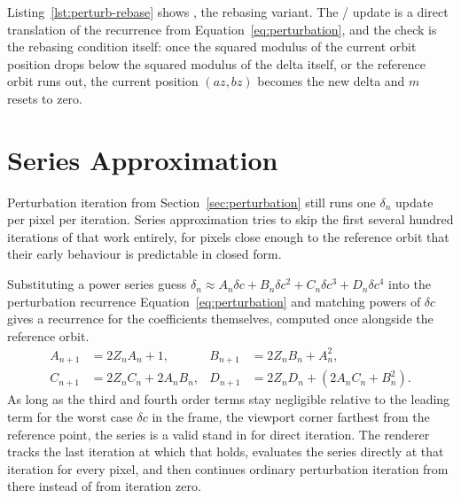 \documentclass{ftndiplomski}
\begin{document}
Listing~\ref{lst:perturb-rebase} shows , the rebasing variant.
The / update is a direct translation of the recurrence from
Equation~\ref{eq:perturbation}, and the check  is the rebasing condition itself: once the squared modulus of the current orbit
position drops below the squared modulus of the delta itself, or the reference orbit runs out, the
current position $(az, bz)$ becomes the new delta and $m$ resets to zero.

\noindent\begin{minipage}{\linewidth}

\end{minipage}

\section{Series Approximation}
\label{sec:series-approximation}

Perturbation iteration from Section~\ref{sec:perturbation} still runs one $\delta_n$ update per
pixel per iteration. Series approximation \cite{martin2013superfractalthing,
heilandallen2021deepzoom} tries to skip the first several hundred iterations of that work
entirely, for pixels close enough to the reference orbit that their early behaviour is predictable
in closed form.

Substituting a power series guess $\delta_n \approx A_n \delta c + B_n \delta c^2 +
C_n \delta c^3 + D_n \delta c^4$ into the perturbation recurrence Equation~\ref{eq:perturbation}
and matching powers of $\delta c$ gives a recurrence for the coefficients themselves, computed once
alongside the reference orbit.
\begin{align}
  \label{eq:sa-coefficients}
  A_{n+1} &= 2 Z_n A_n + 1, &
  B_{n+1} &= 2 Z_n B_n + A_n^2, \\
  C_{n+1} &= 2 Z_n C_n + 2 A_n B_n, &
  D_{n+1} &= 2 Z_n D_n + \left(2 A_n C_n + B_n^2\right).
\end{align}
As long as the third and fourth order terms stay negligible relative to the leading term for the
worst case $\delta c$ in the frame, the viewport corner farthest from the reference point, the
series is a valid stand in for direct iteration. The renderer tracks the last iteration at which
that holds, evaluates the series directly at that iteration for every pixel, and then continues
ordinary perturbation iteration from there instead of from iteration zero.
\end{document}
